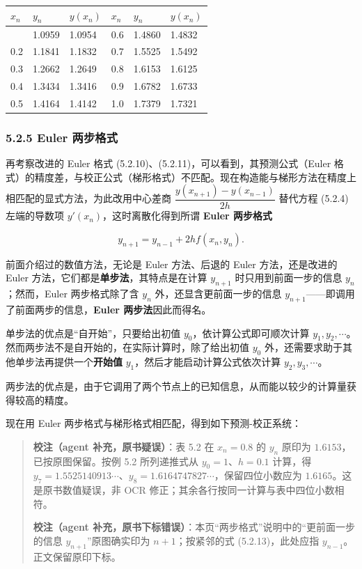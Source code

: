 \documentclass[
  10pt,
  fontset=fandol]{ctexart}
\newcounter{none} %
\begin{document}
{\def\LTcaptype{none} %
\begin{longtable}[]{@{}llllll@{}}
\toprule\noalign{}
\(x_n\) & \(y_n\) & \(y(x_n)\) & \(x_n\) & \(y_n\) & \(y(x_n)\) \\
\midrule\noalign{}
\endhead
\bottomrule\noalign{}
\endlastfoot
0.1 & 1.0959 & 1.0954 & 0.6 & 1.4860 & 1.4832 \\
0.2 & 1.1841 & 1.1832 & 0.7 & 1.5525 & 1.5492 \\
0.3 & 1.2662 & 1.2649 & 0.8 & 1.6153 & 1.6125 \\
0.4 & 1.3434 & 1.3416 & 0.9 & 1.6782 & 1.6733 \\
0.5 & 1.4164 & 1.4142 & 1.0 & 1.7379 & 1.7321 \\
\end{longtable}
}

\subsubsection{5.2.5 Euler 两步格式}\label{euler-ux4e24ux6b65ux683cux5f0f}

再考察改进的 Euler 格式 (5.2.10)、(5.2.11)，可以看到，其预测公式（Euler 格式）的精度差，与校正公式（梯形格式）不匹配。现在构造能与梯形方法在精度上相匹配的显式方法，为此改用中心差商 \(\dfrac{y(x_{n+1})-y(x_{n-1})}{2h}\) 替代方程 (5.2.4) 左端的导数项 \(y'(x_n)\)，这时离散化得到所谓 \textbf{Euler 两步格式}

\[
y_{n+1}=y_{n-1}+2hf(x_n,y_n).\tag{5.2.13}
\]

前面介绍过的数值方法，无论是 Euler 方法、后退的 Euler 方法，还是改进的 Euler 方法，它们都是\textbf{单步法}，其特点是在计算 \(y_{n+1}\) 时只用到前面一步的信息 \(y_n\)；然而，Euler 两步格式除了含 \(y_n\) 外，还显含更前面一步的信息 \(y_{n+1}\)------即调用了前面两步的信息，\textbf{Euler 两步法}因此而得名。

单步法的优点是``自开始''，只要给出初值 \(y_0\)，依计算公式即可顺次计算 \(y_1,y_2,\cdots\)。然而两步法不是自开始的，在实际计算时，除了给出初值 \(y_0\) 外，还需要求助于其他单步法再提供一个\textbf{开始值} \(y_1\)，然后才能启动计算公式依次计算 \(y_2,y_3,\cdots\)。

两步法的优点是，由于它调用了两个节点上的已知信息，从而能以较少的计算量获得较高的精度。

现在用 Euler 两步格式与梯形格式相匹配，得到如下预测-校正系统：

\begin{quote}
\textbf{校注（agent 补充，原书疑误）}：表 5.2 在 \(x_n=0.8\) 的 \(y_n\) 原印为 \(1.6153\)，已按原图保留。按例 5.2 所列递推式从 \(y_0=1\)、\(h=0.1\) 计算，得 \(y_7=1.5525140913\cdots\)、\(y_8=1.6164747827\cdots\)，保留四位小数应为 \(1.6165\)。这是原书数值疑误，非 OCR 修正；其余各行按同一计算与表中四位小数相符。

\textbf{校注（agent 补充，原书下标错误）}：本页``两步格式''说明中的``更前面一步的信息 \(y_{n+1}\)''原图确实印为 \(n+1\)；按紧邻的式 (5.2.13)，此处应指 \(y_{n-1}\)。正文保留原印下标。
\end{quote}
\end{document}
